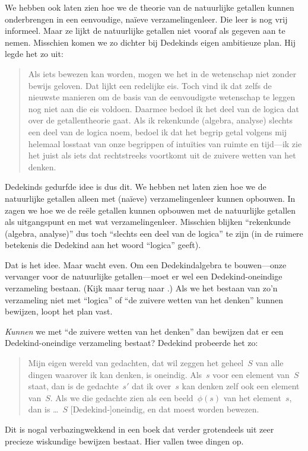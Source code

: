 \documentclass[../../../include/open-logic-section]{subfiles}
\begin{document}
We hebben ook laten zien hoe we de theorie van de natuurlijke getallen
kunnen onderbrengen in een eenvoudige, na\"ieve verzamelingenleer. Die
leer is nog vrij informeel. Maar ze lijkt de natuurlijke getallen niet
vooraf als gegeven aan te nemen. Misschien komen we zo dichter bij
Dedekinds eigen ambitieuze plan. Hij legde het zo uit:
\begin{quote}
	Als iets bewezen kan worden, mogen we het in de wetenschap niet zonder
	bewijs geloven. Dat lijkt een redelijke eis. Toch vind ik dat zelfs de
	nieuwste manieren om de basis van de eenvoudigste wetenschap te leggen
	nog niet aan die eis voldoen. Daarmee bedoel ik het deel van de logica
	dat over de getallentheorie gaat. Als ik rekenkunde (algebra, analyse)
	slechts een deel van de logica noem, bedoel ik dat het begrip getal
	volgens mij helemaal losstaat van onze begrippen of intuïties van
	ruimte en tijd---ik zie het juist als iets dat rechtstreeks voortkomt
	uit de zuivere wetten van het denken.
	\citep[voorwoord]{Dedekind1888}
\end{quote}
Dedekinds gedurfde idee is dus dit. We hebben net laten zien hoe we de
natuurlijke getallen alleen met (na\"ieve) verzamelingenleer kunnen
opbouwen. In  zagen we hoe we de reële
getallen kunnen opbouwen met de natuurlijke getallen als uitgangspunt
en met wat verzamelingenleer. Misschien blijken ``rekenkunde (algebra,
analyse)'' dus toch ``slechts een deel van de logica'' te zijn (in de
ruimere betekenis die Dedekind aan het woord ``logica'' geeft).

Dat is het idee. Maar wacht even. Om een Dedekindalgebra te
bouwen---onze vervanger voor de natuurlijke getallen---moet er wel een
Dedekind-oneindige verzameling bestaan. (Kijk maar terug naar
.) Als we
het bestaan van zo'n verzameling niet met ``logica'' of ``de zuivere
wetten van het denken'' kunnen bewijzen, loopt het plan vast.

\emph{Kunnen} we met ``de zuivere wetten van het denken'' dan bewijzen
dat er een Dedekind-oneindige verzameling bestaat? Dedekind probeerde
het zo:
\begin{quote}
  Mijn eigen wereld van gedachten, dat wil zeggen het geheel~$S$ van alle
  dingen waarover ik kan denken, is oneindig. Als~$s$ voor een element
  van~$S$ staat, dan is de gedachte~$s'$ dat ik over~$s$ kan denken zelf
  ook een element van~$S$. Als we die gedachte zien als een
  beeld~$\phi(s)$ van het element~$s$, dan is \dots~$S$
  [Dedekind-]oneindig, en dat moest worden bewezen.
	\citep[\S66]{Dedekind1888}
\end{quote}
Dit is nogal verbazingwekkend in een boek dat verder grotendeels uit
zeer precieze wiskundige bewijzen bestaat. Hier vallen twee dingen op.
\end{document}
